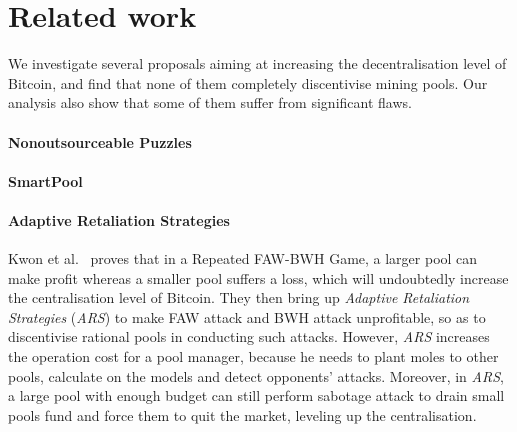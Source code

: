 \section{Related work}

We investigate several proposals aiming at increasing the decentralisation level of Bitcoin, and find that none of them completely discentivise mining pools.
Our analysis also show that some of them suffer from significant flaws.

\paragraph{\textbf{Nonoutsourceable Puzzles}}


\paragraph{\textbf{SmartPool}}

\paragraph{\textbf{Adaptive Retaliation Strategies}}
Kwon et al.~\cite{kwon2019eye} proves that in a Repeated FAW\cite{courtois2014subversive,rosenfeld2011analysis}-BWH\cite{kwon2017selfish} Game, a larger pool can make profit whereas a smaller pool suffers a loss, which will undoubtedly increase the centralisation level of Bitcoin.
They then bring up \textit{Adaptive Retaliation Strategies} (\textit{ARS}) to make FAW attack and BWH attack unprofitable, so as to discentivise rational pools in conducting such attacks.
However, \textit{ARS} increases the operation cost for a pool manager, because he needs to plant moles to other pools, calculate on the models and detect opponents' attacks.
Moreover, in \textit{ARS}, a large pool with enough budget can still perform sabotage attack to drain small pools fund and force them to quit the market, leveling up the centralisation.


